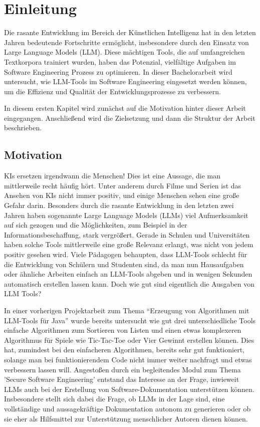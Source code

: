 
\chapter{Einleitung} 

Die rasante Entwicklung im Bereich der Künstlichen Intelligenz hat in den letzten Jahren bedeutende Fortschritte ermöglicht, 
insbesondere durch den Einsatz von Large Language Models (LLM). Diese mächtigen Tools, die auf umfangreichen Textkorpora 
trainiert wurden, haben das Potenzial, vielfältige Aufgaben im Software Engineering Prozess zu optimieren. 
In dieser Bachelorarbeit wird untersucht, wie LLM-Tools im Software Engineering eingesetzt werden können, um die Effizienz und 
Qualität der Entwicklungsprozesse zu verbessern.

In diesem ersten Kapitel wird zunächst auf die Motivation hinter dieser Arbeit eingegangen. Anschließend wird die Zielsetzung 
und dann die Struktur der Arbeit beschrieben.

\section{Motivation}  \label{Motivation}

KIs ersetzen irgendwann die Menschen! Dies ist eine Aussage, die man mittlerweile recht häufig hört. Unter anderem durch Filme 
und Serien ist das Ansehen von KIs nicht immer positiv, und einige Menschen sehen eine große Gefahr darin. Besonders durch die 
rasante Entwicklung in den letzten zwei Jahren haben sogenannte Large Language Models (LLMs) viel Aufmerksamkeit auf sich gezogen 
und die Möglichkeiten, zum Beispiel in der Informationsbeschaffung, stark vergrößert. Gerade in Schulen und Universitäten haben 
solche Tools mittlerweile eine große Relevanz erlangt, was nicht von jedem positiv gesehen wird. Viele Pädagogen behaupten, dass 
LLM-Tools schlecht für die Entwicklung von Schülern und Studenten sind, da man nun Hausaufgaben oder ähnliche Arbeiten einfach an 
LLM-Tools abgeben und in wenigen Sekunden automatisch erstellen lassen kann. Doch wie gut sind eigentlich die Ausgaben von LLM Tools?

In einer vorherigen Projektarbeit zum Thema ``Erzeugung von Algorithmen mit LLM-Tools für Java'' wurde bereits untersucht 
wie gut drei unterschiedliche Tools einfache Algorithmen zum Sortieren von Listen und einen etwas komplexeren Algorithmus 
für Spiele wie Tic-Tac-Toe oder Vier Gewinnt erstellen können. Dies hat, zumindest bei den einfacheren Algorithmen, bereits 
sehr gut funktioniert, solange man bei funktionierendem Code nicht immer weiter nachfragt und etwas verbessern lassen will.
Angestoßen durch ein begleitendes Modul zum Thema 'Secure Software Engineering' entstand das Interesse an der Frage, inwieweit 
LLMs auch bei der Erstellung von Software-Dokumentation unterstützen können. Insbesondere stellt sich dabei die Frage, ob LLMs 
in der Lage sind, eine vollständige und aussagekräftige Dokumentation autonom zu generieren oder ob sie eher als Hilfsmittel zur 
Unterstützung menschlicher Autoren dienen können.

